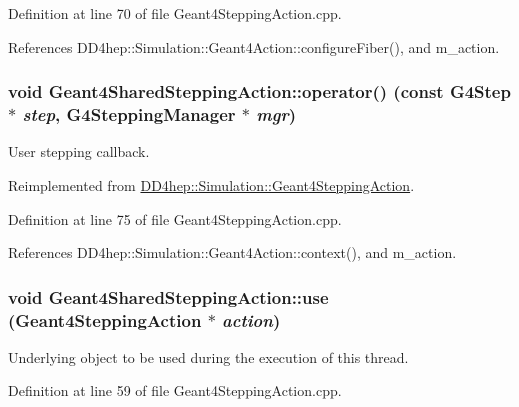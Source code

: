 Definition at line 70 of file Geant4SteppingAction.cpp.

References DD4hep::Simulation::Geant4Action::configureFiber(), and m\_\-action.\hypertarget{class_d_d4hep_1_1_simulation_1_1_geant4_shared_stepping_action_a5128c3fa4f478cda734a35a09ee86ae0}{
\subsubsection[{operator()}]{\setlength{\rightskip}{0pt plus 5cm}void Geant4SharedSteppingAction::operator() (const G4Step $\ast$ {\em step}, \/  G4SteppingManager $\ast$ {\em mgr})}}
\label{class_d_d4hep_1_1_simulation_1_1_geant4_shared_stepping_action_a5128c3fa4f478cda734a35a09ee86ae0}


User stepping callback. 

Reimplemented from \hyperlink{class_d_d4hep_1_1_simulation_1_1_geant4_stepping_action_ab6b61f6eaed6d06ddb3a7ed319258317}{DD4hep::Simulation::Geant4SteppingAction}.

Definition at line 75 of file Geant4SteppingAction.cpp.

References DD4hep::Simulation::Geant4Action::context(), and m\_\-action.\hypertarget{class_d_d4hep_1_1_simulation_1_1_geant4_shared_stepping_action_a2c04725bc0820515ab86fde2ead70829}{
\subsubsection[{use}]{\setlength{\rightskip}{0pt plus 5cm}void Geant4SharedSteppingAction::use ({\bf Geant4SteppingAction} $\ast$ {\em action})}}
\label{class_d_d4hep_1_1_simulation_1_1_geant4_shared_stepping_action_a2c04725bc0820515ab86fde2ead70829}


Underlying object to be used during the execution of this thread. 

Definition at line 59 of file Geant4SteppingAction.cpp.


